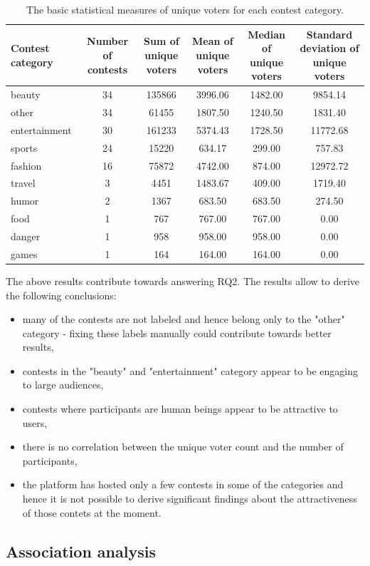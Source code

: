     \begin{table}[]
        \centering
        \begin{adjustbox}{width=1\textwidth}
            \begin{tabular}{l|c|c|c|c|c}
                \textbf{Contest category} & \textbf{Number of contests} & \textbf{Sum of unique voters} & \textbf{Mean of unique voters} & \textbf{Median of unique voters} & \textbf{Standard deviation of unique voters} \\
                \hline
                beauty & 34 & 135866 & 3996.06 & 1482.00 & 9854.14 \\
                other & 34 & 61455 & 1807.50 & 1240.50 & 1831.40 \\
                entertainment & 30 & 161233 & 5374.43 & 1728.50 & 11772.68 \\
                sports & 24 & 15220 & 634.17 & 299.00 & 757.83 \\
                fashion & 16 & 75872 & 4742.00 & 874.00 & 12972.72 \\
                travel & 3 & 4451 & 1483.67 & 409.00 & 1719.40 \\
                humor & 2 & 1367 & 683.50 & 683.50 & 274.50 \\
                food & 1 & 767 & 767.00 & 767.00 & 0.00 \\
                danger & 1 & 958 & 958.00 & 958.00 & 0.00 \\
                games & 1 & 164 & 164.00 & 164.00 & 0.00
            \end{tabular}
        \end{adjustbox}
        \caption{The basic statistical measures of unique voters for each contest category.}
        \label{user_engagement_over_categories}
    \end{table} 

    The above results contribute towards answering RQ2. The results allow to derive the following conclusions: 

    \begin{itemize}
        \item many of the contests are not labeled and hence belong only to the "other" category - fixing these labels manually could contribute towards better results,
        \item contests in the "beauty" and "entertainment" category appear to be engaging to large audiences,
        \item contests where participants are human beings appear to be attractive to users,
        \item there is no correlation between the unique voter count and the number of participants,
        \item the platform has hosted only a few contests in some of the categories and hence it is not possible to derive significant findings about the attractiveness of those contets at the moment.
    \end{itemize}

\subsection{Association analysis}
